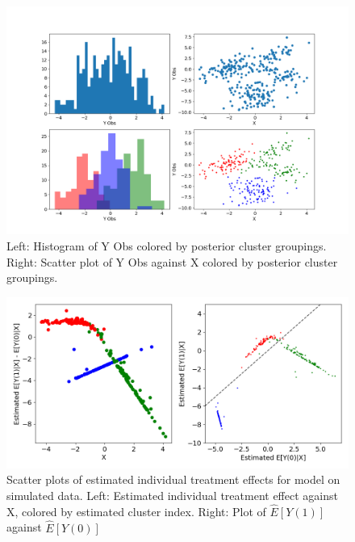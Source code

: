 \documentclass{article}
\begin{document}
\begin{figure}[H]
  \centering
  \includegraphics[width=1\textwidth]{Plots/simulated_cluster_scatter.png}
  \caption{Left: Histogram of Y Obs colored by posterior cluster groupings. Right: Scatter plot of Y Obs against X colored by posterior cluster groupings.}
  \label{fig:sim_scatter_plots}
\end{figure}

\begin{figure}[H]
  \centering
  \includegraphics[width=1\textwidth]{Plots/Simulated_output_scatted.png}
  \caption{Scatter plots of estimated individual treatment effects for model on simulated data. Left: Estimated individual treatment effect against X, colored by estimated cluster index. Right: Plot of $\hat{E}[Y(1)]$ against $\hat{E}[Y(0)]$}
  \label{fig:sim_scatter_plots}
\end{figure}
\end{document}
